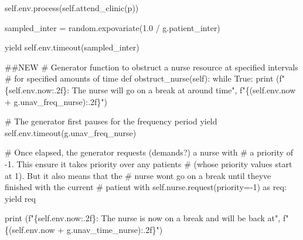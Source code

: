 \documentclass[
  letterpaper,
  DIV=11,
  numbers=noendperiod]{scrreprt}
\newenvironment{Shaded}{}{}
\newcommand{\BuiltInTok}[1]{\textcolor[rgb]{0.84,0.23,0.29}{#1}}
\newcommand{\CommentTok}[1]{\textcolor[rgb]{0.42,0.45,0.49}{#1}}
\newcommand{\ControlFlowTok}[1]{\textcolor[rgb]{0.84,0.23,0.29}{#1}}
\newcommand{\DecValTok}[1]{\textcolor[rgb]{0.00,0.36,0.77}{#1}}
\newcommand{\FloatTok}[1]{\textcolor[rgb]{0.00,0.36,0.77}{#1}}
\newcommand{\ImportTok}[1]{\textcolor[rgb]{0.01,0.18,0.38}{#1}}
\newcommand{\KeywordTok}[1]{\textcolor[rgb]{0.84,0.23,0.29}{#1}}
\newcommand{\NormalTok}[1]{\textcolor[rgb]{0.14,0.16,0.18}{#1}}
\newcommand{\OperatorTok}[1]{\textcolor[rgb]{0.14,0.16,0.18}{#1}}
\newcommand{\SpecialCharTok}[1]{\textcolor[rgb]{0.00,0.36,0.77}{#1}}
\newcommand{\SpecialStringTok}[1]{\textcolor[rgb]{0.01,0.18,0.38}{#1}}
\newcommand{\VariableTok}[1]{\textcolor[rgb]{0.89,0.38,0.04}{#1}}
\begin{document}
\begin{tcolorbox}
\begin{Shaded}
\begin{Highlighting}[]
            \VariableTok{self}\NormalTok{.env.process(}\VariableTok{self}\NormalTok{.attend\_clinic(p))}

\NormalTok{            sampled\_inter }\OperatorTok{=}\NormalTok{ random.expovariate(}\FloatTok{1.0} \OperatorTok{/}\NormalTok{ g.patient\_inter)}

            \ControlFlowTok{yield} \VariableTok{self}\NormalTok{.env.timeout(sampled\_inter)}

    \CommentTok{\#\#NEW}
    \CommentTok{\# Generator function to obstruct a nurse resource at specified intervals}
    \CommentTok{\# for specified amounts of time}
    \KeywordTok{def}\NormalTok{ obstruct\_nurse(}\VariableTok{self}\NormalTok{):}
        \ControlFlowTok{while} \VariableTok{True}\NormalTok{:}
            \BuiltInTok{print}\NormalTok{ (}\SpecialStringTok{f"}\SpecialCharTok{\{}\VariableTok{self}\SpecialCharTok{.}\NormalTok{env}\SpecialCharTok{.}\NormalTok{now}\SpecialCharTok{:.2f\}}\SpecialStringTok{: The nurse will go on a break at around time"}\NormalTok{,}
                   \SpecialStringTok{f"}\SpecialCharTok{\{}\NormalTok{(}\VariableTok{self}\NormalTok{.env.now }\OperatorTok{+}\NormalTok{ g.unav\_freq\_nurse)}\SpecialCharTok{:.2f\}}\SpecialStringTok{"}\NormalTok{)}

            \CommentTok{\# The generator first pauses for the frequency period}
            \ControlFlowTok{yield} \VariableTok{self}\NormalTok{.env.timeout(g.unav\_freq\_nurse)}

            \CommentTok{\# Once elapsed, the generator requests (demands?) a nurse with}
            \CommentTok{\# a priority of {-}1.  This ensure it takes priority over any patients}
            \CommentTok{\# (whose priority values start at 1).  But it also means that the}
            \CommentTok{\# nurse won\textquotesingle{}t go on a break until they\textquotesingle{}ve finished with the current}
            \CommentTok{\# patient}
            \ControlFlowTok{with} \VariableTok{self}\NormalTok{.nurse.request(priority}\OperatorTok{={-}}\DecValTok{1}\NormalTok{) }\ImportTok{as}\NormalTok{ req:}
                \ControlFlowTok{yield}\NormalTok{ req}

                \BuiltInTok{print}\NormalTok{ (}\SpecialStringTok{f"}\SpecialCharTok{\{}\VariableTok{self}\SpecialCharTok{.}\NormalTok{env}\SpecialCharTok{.}\NormalTok{now}\SpecialCharTok{:.2f\}}\SpecialStringTok{: The nurse is now on a break and will be back at"}\NormalTok{,}
                       \SpecialStringTok{f"}\SpecialCharTok{\{}\NormalTok{(}\VariableTok{self}\NormalTok{.env.now }\OperatorTok{+}\NormalTok{ g.unav\_time\_nurse)}\SpecialCharTok{:.2f\}}\SpecialStringTok{"}\NormalTok{)}


\end{Highlighting}
\end{Shaded}
\end{tcolorbox}
\end{document}

